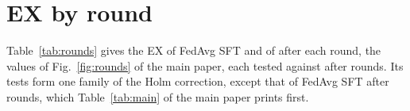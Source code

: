 \section{EX by round}\label{sup:rounds}

Table~\ref{tab:rounds} gives the EX of FedAvg SFT and of \method{} after
each round, the values of Fig.~\ref{fig:rounds} of the main paper, each
tested against \method{} after  rounds. Its tests
form one family of the Holm correction, except that of FedAvg SFT after
 rounds, which Table~\ref{tab:main} of the main
paper prints first.

\begin{table}[!ht]
\caption{EX (\%) after each round on BIRD dev and Spider test. \method{}
continues from FedAvg SFT after round~, and FedAvg
SFT has a fifth round on Spider test only. $\Delta$ and $p$ compare each
row with \method{} after  rounds.}\label{tab:rounds}
\footnotesize

\end{table}
